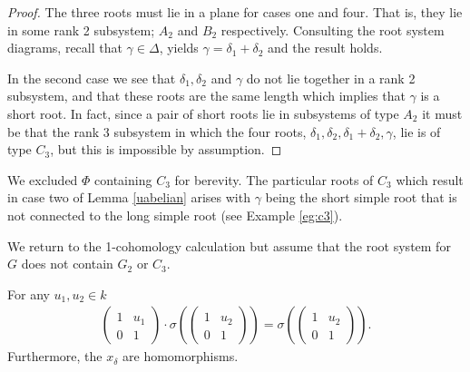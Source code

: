 \begin{proof}
The three roots must lie in a plane for cases one and four. That is, they lie in some rank 2 subsystem; $A_2$ and $B_2$ respectively. Consulting the root system diagrams, recall that $\gamma \in \Delta$, yields $\gamma = \delta_1 + \delta_2$ and the result holds.

In the second case we see that $\delta_1, \delta_2$ and $\gamma$ do not lie together in a rank 2 subsystem, and that these roots are the same length which implies that $\gamma$ is a short root. In fact, since a pair of short roots lie in subsystems of type $A_2$ it must be that the rank 3 subsystem in which the four roots, $\delta_1, \delta_2, \delta_1 + \delta_2, \gamma$, lie is of type $C_3$, but this is impossible by assumption. 
\end{proof}

We excluded $\Phi$ containing $C_3$ for berevity. The particular roots of $C_3$ which result in case two of Lemma \ref{uabelian} arises with $\gamma$ being the short simple root that is not connected to the long simple root (see Example \ref{eg:c3}).

We return to the 1-cohomology calculation but assume that the root system for $G$ does not contain $G_2$ or $C_3$.

\begin{corollary}\label{uact} For any $u_1, u_2 \in k$
\begin{eqnarray*}
\left(\begin{matrix}1 & u_1 \\ 0 & 1 \end{matrix}\right)
\cdot
\sigma\left(\left(\begin{matrix} 1 & u_2 \\ 0 & 1\end{matrix}\right)\right)
=
\sigma\left(\left(\begin{matrix} 1 & u_2 \\ 0 & 1\end{matrix}\right)\right).
\end{eqnarray*}
Furthermore, the $x_\delta$ are homomorphisms.
\end{corollary}

